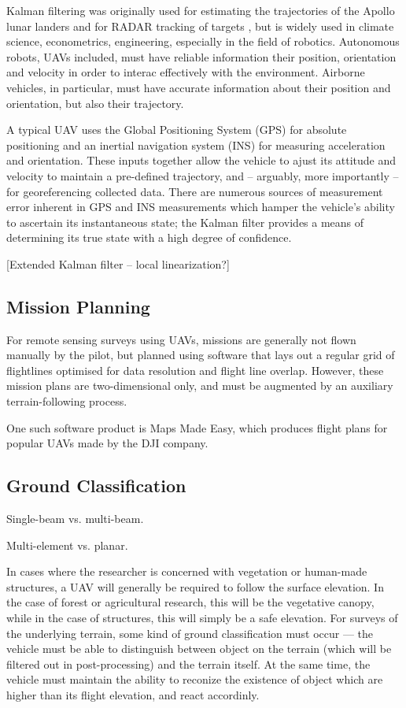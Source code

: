 \documentclass[10pt,a4paper]{report}
\begin{document}
Kalman filtering was originally used for estimating the trajectories of the Apollo lunar landers and for RADAR tracking of targets \cite{Grewal2010}, but is widely used in climate science, econometrics, engineering, especially in the field of robotics. Autonomous robots, UAVs included, must have reliable information their position, orientation and velocity in order to interac effectively with the environment. Airborne vehicles, in particular, must have accurate information about their position and orientation, but also their trajectory.

A typical UAV uses the Global Positioning System (GPS) for absolute positioning and an inertial navigation system (INS) for measuring acceleration and orientation. These inputs together allow the vehicle to ajust its attitude and velocity to maintain a pre-defined trajectory, and -- arguably, more importantly -- for georeferencing collected data. There are numerous sources of measurement error inherent in GPS and INS measurements which hamper the vehicle's ability to ascertain its instantaneous state; the Kalman filter provides a means of determining its true state with a high degree of confidence.

[Extended Kalman filter -- local linearization?]

\fi

\subsection{Mission Planning}


For remote sensing surveys using UAVs, missions are generally not flown manually by the pilot, but planned using software that lays out a regular grid of flightlines optimised for data resolution and flight line overlap. However, these mission plans are two-dimensional only, and must be augmented by an auxiliary terrain-following process.

One such software product is Maps Made Easy, which produces flight plans for popular UAVs made by the DJI company. 


\subsection{Ground Classification}

Single-beam vs. multi-beam.

Multi-element vs. planar. \cite{Nobili2015}


In cases where the researcher is concerned with vegetation or human-made structures, a UAV will generally be required to follow the surface elevation. In the case of forest or agricultural research, this will be the vegetative canopy, while in the case of structures, this will simply be a safe elevation. For surveys of the underlying terrain, some kind of ground classification must occur --- the vehicle must be able to distinguish between object on the terrain (which will be filtered out in post-processing) and the terrain itself. At the same time, the vehicle must maintain the ability to reconize the existence of object which are higher than its flight elevation, and react accordinly.
\end{document}
